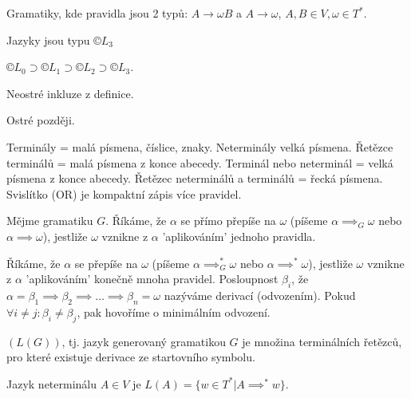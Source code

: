 \documentclass[12pt]{article}                   %
\begin{document}
    \begin{definice}
        Gramatiky, kde pravidla jsou 2 typů: $A \rightarrow \omega B$ a $A \rightarrow \omega$, $A, B \in V, \omega \in T^*$.

        Jazyky jsou typu $©L_3$
    \end{definice}

    \begin{pozorovani}
        $©L_0 \supset ©L_1 \supset ©L_2 \supset ©L_3$.

        \begin{dukazin}
            Neostré inkluze z definice.

            Ostré později.
        \end{dukazin}
    \end{pozorovani}

    \begin{poznamka}[Notace]
        Terminály = malá písmena, číslice, znaky. Neterminály velká písmena. Řetězce terminálů = malá písmena z konce abecedy. Terminál nebo neterminál = velká písmena z konce abecedy. Řetězec neterminálů a terminálů = řecká písmena. Svislítko (OR) je kompaktní zápis více pravidel.
    \end{poznamka}

    \begin{definice}
        Mějme gramatiku $G$. Říkáme, že $\alpha$ se přímo přepíše na $\omega$ (píšeme $\alpha \implies_G \omega$ nebo $\alpha \implies \omega$), jestliže $\omega$ vznikne z $\alpha$ 'aplikováním' jednoho pravidla.
        
        Říkáme, že $\alpha$ se přepíše na $\omega$ (píšeme $\alpha \implies_G^* \omega$ nebo $\alpha \implies^* \omega$), jestliže $\omega$ vznikne z $\alpha$ 'aplikováním' konečně mnoha pravidel. Posloupnost $\beta_i$, že $\alpha = \beta_1 \implies \beta_2 \implies … \implies \beta_n = \omega$ nazýváme derivací (odvozením). Pokud $\forall i ≠ j: \beta_i ≠ \beta_j$, pak hovoříme o minimálním odvození.
    \end{definice}

    \begin{definice}
        $(L(G))$, tj. jazyk generovaný gramatikou $G$ je množina terminálních řetězců, pro které existuje derivace ze startovního symbolu.

        Jazyk neterminálu $A \in V$ je $L(A) = \{w \in T^* | A \implies^* w\}$.
    \end{definice}
\end{document}
